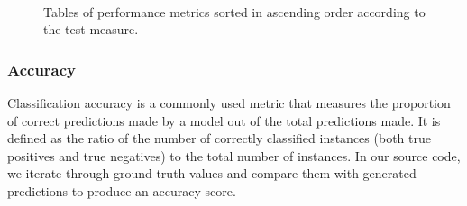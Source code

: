 \documentclass[11pt, conference]{IEEEtran}
\begin{document}
    \begin{figure}[ht!]
        \centering
         \\
        \caption{Tables of performance metrics sorted in ascending order according to the test measure.}
        \label{fig:graphic2}
    \end{figure}

    \subsubsection{Accuracy}
    Classification accuracy is a commonly used metric that measures the proportion of correct predictions made by a model out of the total predictions made. It is defined as the ratio of the number of correctly classified instances (both true positives and true negatives) to the total number of instances. In our source code, we iterate through ground truth values and compare them with generated predictions to produce an accuracy score.
\end{document}
